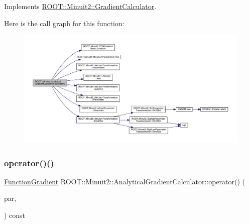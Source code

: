 Implements \mbox{\hyperlink{classROOT_1_1Minuit2_1_1GradientCalculator_a1bae913e96ffc9ece28664a5f6f79cb0}{R\+O\+O\+T\+::\+Minuit2\+::\+Gradient\+Calculator}}.

Here is the call graph for this function\+:\nopagebreak
\begin{figure}[H]
\begin{center}
\leavevmode
\includegraphics[width=350pt]{dd/d3a/classROOT_1_1Minuit2_1_1AnalyticalGradientCalculator_aff4787568d15aaf6dac1c8ffa1bd9db7_cgraph}
\end{center}
\end{figure}
\mbox{\label{classROOT_1_1Minuit2_1_1AnalyticalGradientCalculator_ad16442d24717c36e7d32897a2f8951c0}} 
\subsubsection{\texorpdfstring{operator()()}{operator()()}\hspace{0.1cm}{\footnotesize\ttfamily [3/4]}}
{\footnotesize\ttfamily \mbox{\hyperlink{classROOT_1_1Minuit2_1_1FunctionGradient}{Function\+Gradient}} R\+O\+O\+T\+::\+Minuit2\+::\+Analytical\+Gradient\+Calculator\+::operator() (\begin{DoxyParamCaption}\item[{const \mbox{\hyperlink{classROOT_1_1Minuit2_1_1MinimumParameters}{Minimum\+Parameters}} \&}]{par,  }\item[{const \mbox{\hyperlink{classROOT_1_1Minuit2_1_1FunctionGradient}{Function\+Gradient}} \&}]{ }\end{DoxyParamCaption}) const\hspace{0.3cm}{\ttfamily [virtual]}}



